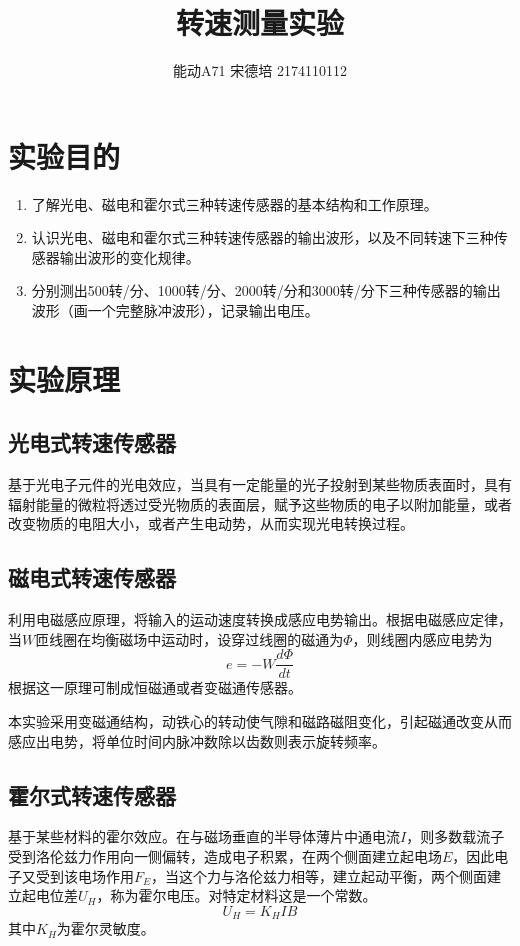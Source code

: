 \documentclass[UTF8]{article}
\title{转速测量实验}
\author{能动A71 宋德培 2174110112}
\begin{document}
	\maketitle
	\section{实验目的}
	\begin{enumerate}
	\item 了解光电、磁电和霍尔式三种转速传感器的基本结构和工作原理。
	\item 认识光电、磁电和霍尔式三种转速传感器的输出波形，以及不同转速下三种传感器输出波形的变化规律。
	\item 分别测出500转/分、1000转/分、2000转/分和3000转/分下三种传感器的输出波形（画一个完整脉冲波形），记录输出电压。
	
	\end{enumerate}
	
	\section{实验原理}
	\subsection{光电式转速传感器}
	基于光电子元件的光电效应，当具有一定能量的光子投射到某些物质表面时，具有辐射能量的微粒将透过受光物质的表面层，赋予这些物质的电子以附加能量，或者改变物质的电阻大小，或者产生电动势，从而实现光电转换过程。
	\subsection{磁电式转速传感器}
	利用电磁感应原理，将输入的运动速度转换成感应电势输出。根据电磁感应定律，当$W$匝线圈在均衡磁场中运动时，设穿过线圈的磁通为$\Phi$，则线圈内感应电势为
	\[
	e = -W\frac{d\Phi}{dt}
	\]
	根据这一原理可制成恒磁通或者变磁通传感器。
	
	本实验采用变磁通结构，动铁心的转动使气隙和磁路磁阻变化，引起磁通改变从而感应出电势，将单位时间内脉冲数除以齿数则表示旋转频率。
	\subsection{霍尔式转速传感器}
	基于某些材料的霍尔效应。在与磁场垂直的半导体薄片中通电流$I$，则多数载流子受到洛伦兹力作用向一侧偏转，造成电子积累，在两个侧面建立起电场$E$，因此电子又受到该电场作用$F_E$，当这个力与洛伦兹力相等，建立起动平衡，两个侧面建立起电位差$U_H$，称为霍尔电压。对特定材料这是一个常数。
	\[
	U_H=K_HIB
	\]
	其中$K_H$为霍尔灵敏度。
\end{document}
